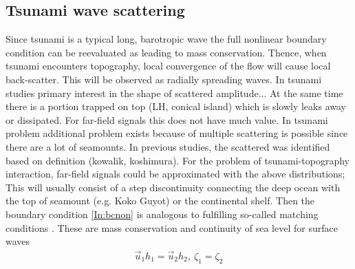 \documentclass[12pt]{article}
\begin{document}
\subsection{Tsunami wave scattering}
Since tsunami is a typical long, barotropic wave the full nonlinear boundary condition can be 
reevaluated as leading to mass conservation. Thence, when tsunami encounters topography, local 
convergence of the flow will cause local back-scatter. This will be observed as radially spreading 
waves.  
In tsunami studies primary interest in the shape of scattered amplitude...  At the same time there 
is a portion trapped on top (LH, 
conical 
island) which is slowly leaks away or dissipated. For far-field signals this does not have much 
value. In tsunami problem additional problem exists because of multiple scattering is possible 
since there are a lot of seamounts. In previous studies, the scattered was identified based on 
definition (kowalik, koshimura). 
For the problem of tsunami-topography interaction, far-field signals could be approximated with the 
above distributions;\\
This will usually consist of a step discontinuity connecting the deep 
ocean with the top of seamount (e.g. Koko Guyot) or the continental shelf. Then the boundary 
condition \eqref{In:bcnon} is analogous to fulfilling so-called matching conditions 
\citep{mei1989theory}. These are mass conservation and continuity of sea level for surface waves
\begin{align}
\vec{u}_1 h_1 = \vec{u}_2 h_2,~\zeta_1 = \zeta_2
\end{align}
\end{document}
